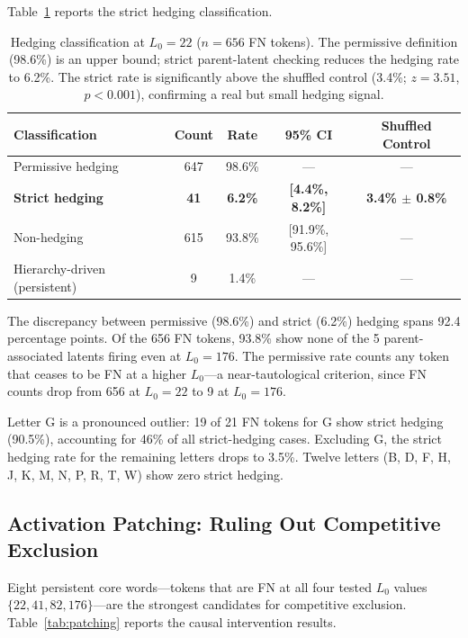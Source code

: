 \documentclass{article}
\begin{document}
Table~\ref{tab:hedging} reports the strict hedging classification.

\begin{table}[t]
\caption{Hedging classification at $L_0 = 22$ ($n = 656$ FN tokens). The permissive definition (98.6\%) is an upper bound; strict parent-latent checking reduces the hedging rate to 6.2\%. The strict rate is significantly above the shuffled control (3.4\%; $z = 3.51$, $p < 0.001$), confirming a real but small hedging signal.}
\label{tab:hedging}
\centering
\small
\begin{tabular}{lcccc}
\toprule
Classification & Count & Rate & 95\% CI & Shuffled Control \\
\midrule
Permissive hedging & 647 & 98.6\% & --- & --- \\
\textbf{Strict hedging} & \textbf{41} & \textbf{6.2\%} & \textbf{[4.4\%, 8.2\%]} & \textbf{3.4\% $\pm$ 0.8\%} \\
Non-hedging & 615 & 93.8\% & [91.9\%, 95.6\%] & --- \\
Hierarchy-driven (persistent) & 9 & 1.4\% & --- & --- \\
\bottomrule
\end{tabular}
\end{table}

The discrepancy between permissive (98.6\%) and strict (6.2\%) hedging spans 92.4 percentage points. Of the 656 FN tokens, 93.8\% show none of the 5 parent-associated latents firing even at $L_0 = 176$. The permissive rate counts any token that ceases to be FN at a higher $L_0$---a near-tautological criterion, since FN counts drop from 656 at $L_0 = 22$ to 9 at $L_0 = 176$.

Letter G is a pronounced outlier: 19 of 21 FN tokens for G show strict hedging (90.5\%), accounting for 46\% of all strict-hedging cases. Excluding G, the strict hedging rate for the remaining letters drops to 3.5\%. Twelve letters (B, D, F, H, J, K, M, N, P, R, T, W) show zero strict hedging.

\subsection{Activation Patching: Ruling Out Competitive Exclusion}

Eight persistent core words---tokens that are FN at all four tested $L_0$ values $\{22, 41, 82, 176\}$---are the strongest candidates for competitive exclusion. Table~\ref{tab:patching} reports the causal intervention results.
\end{document}
